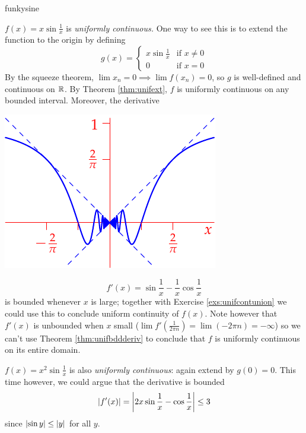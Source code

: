 \begin{examples}{}{funkysine}
\begin{enumerate}
	
		\begin{minipage}[t]{0.6\linewidth}\vspace{0pt}
			\item $f(x)=x\sin\frac 1x$ is \emph{uniformly continuous.} One way to see this is to extend the function to the origin by defining
			\[
				g(x)=
				\begin{cases}
					x\sin \frac 1x&\text{if }x\neq 0\\
					0&\text{if }x=0
				\end{cases}
			\]
			By the squeeze theorem, $\lim x_n=0\implies \lim f(x_n)=0$, so $g$ is well-defined and continuous on $\mathbb{R}$. By Theorem \ref{thm:unifext}, $f$ is uniformly continuous on any bounded interval. Moreover, the derivative
		\end{minipage}
		\hfill
		\begin{minipage}[t]{0.39\linewidth}\vspace{0pt}
			\flushright\includegraphics[scale=0.95]{unifcontex2}
		\end{minipage}\par\vspace{-4pt}
		\[
			f'(x)=\sin\frac 1x-\frac 1x\cos\frac 1x
		\]
		is bounded whenever $x$ is large; together with Exercise \ref{exs:unifcontunion} we could use this to conclude uniform continuity of $f(x)$. Note however that $f'(x)$ is unbounded when $x$ small ($\lim f'\left(\frac 1{2\pi n}\right)=\lim(-2\pi n)=-\infty$)
 so we can't use Theorem \ref{thm:unifbddderiv} to conclude that $f$ is uniformly continuous on its entire domain.

		\begin{minipage}[t]{0.6\linewidth}\vspace{-5pt}
			\item\label{ex:funkysine3} $f(x)=x^2\sin\frac 1x$ is also \emph{uniformly continuous}: again extend by $g(0)=0$. This time however, we could argue that the derivative is bounded
			\[
			\left| f'(x)\right|=
				\left| 2x\sin\frac 1x-\cos\frac 1x\right|\le 3
			\]
			since $\left| \sin y\right|\le\left| y\right|$ for all $y$.\smallbreak
			

\end{minipage}
\end{enumerate}
\end{examples}
